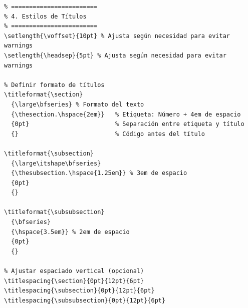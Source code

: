 \documentclass{reporti}
\begin{document}
\begin{verbatim}
% ========================
% 4. Estilos de Títulos
% ========================
\setlength{\voffset}{10pt} % Ajusta según necesidad para evitar warnings
\setlength{\headsep}{5pt} % Ajusta según necesidad para evitar warnings

% Definir formato de títulos
\titleformat{\section}
  {\large\bfseries} % Formato del texto
  {\thesection.\hspace{2em}}   % Etiqueta: Número + 4em de espacio
  {0pt}                        % Separación entre etiqueta y título
  {}                           % Código antes del título

\titleformat{\subsection}
  {\large\itshape\bfseries}
  {\thesubsection.\hspace{1.25em}} % 3em de espacio
  {0pt}
  {}

\titleformat{\subsubsection}
  {\bfseries}
  {\hspace{3.5em}} % 2em de espacio
  {0pt}
  {}

% Ajustar espaciado vertical (opcional)
\titlespacing{\section}{0pt}{12pt}{6pt}
\titlespacing{\subsection}{0pt}{12pt}{6pt}
\titlespacing{\subsubsection}{0pt}{12pt}{6pt}




\end{verbatim}
\end{document}
